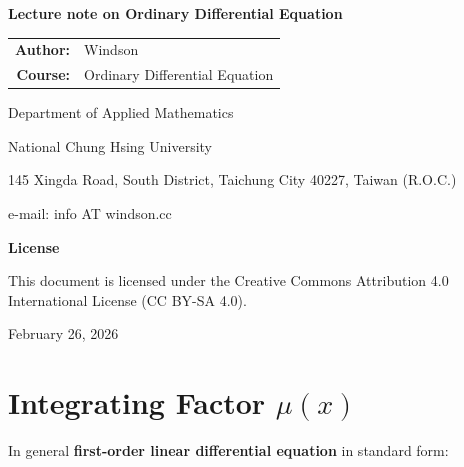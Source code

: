 \documentclass[12pt, a4paper]{article}
\theoremstyle{break}
\begin{document}
\begin{titlepage}
    \begin{center}
        \vspace*{2cm}
        {\LARGE \bfseries Lecture note on Ordinary Differential Equation \par}
        \vspace{3cm}
        \begin{tabular}{rl}
            \textbf{Author:} & Windson \\
            \textbf{Course:} & Ordinary Differential Equation \\
        \end{tabular}
        \vspace{1.5cm}

        {\large Department of Applied Mathematics \par}
        {\large National Chung Hsing University \par}
        \vspace{0.3cm}
        145 Xingda Road, South District, Taichung City 40227, Taiwan (R.O.C.) \par
        e-mail: info AT windson.cc

        \vfill
        {\large \textbf{License} \par}
        {\small This document is licensed under the Creative Commons Attribution 4.0 International License (CC BY-SA 4.0).\par}
        \vspace{1cm}
        {\large February 26, 2026 \par}
    \end{center}
\end{titlepage}

\tableofcontents
\clearpage
{}
\setcounter{page}{1}

\section{\texorpdfstring{Integrating Factor \(\mu (x)\)}{2-1 Integrating Factor \textbackslash mu (x)}}\label{integrating-factor-mu-x}

In general \textbf{first-order linear differential equation }in standard form:
\end{document}
